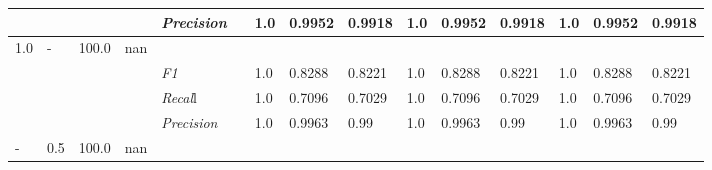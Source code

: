 \begin{table}[]
\begin{tabularx}{\textwidth}{XXlllllllllllll@{}}
                                                                    &                                                                     &                                                           &    & \textit{Precision} &                                                      & 1.0 & 0.9952 & 0.9918 & 1.0 & 0.9952 & 0.9918 & 1.0 & 0.9952 & 0.9918 \\ \midrule
1.0 & - & 100.0 & nan &                                                              &                                                                   &                                                             &                                                               &                                                                    &                                                              &                                                               &                                                                    &                                                              \\
                                                                    &                                                                     &                                                           &    & \textit{F1} &                                                      & 1.0        & 0.8288        & 0.8221        & 1.0        & 0.8288        & 0.8221        & 1.0        & 0.8288        & 0.8221        \\
                                                                    &                                                                     &                                                           &    & \textit{Recal}l &                                                      & 1.0    & 0.7096    & 0.7029    & 1.0    & 0.7096    & 0.7029    & 1.0    & 0.7096    & 0.7029    \\
                                                                    &                                                                     &                                                           &    & \textit{Precision} &                                                      & 1.0 & 0.9963 & 0.99 & 1.0 & 0.9963 & 0.99 & 1.0 & 0.9963 & 0.99 \\ \midrule
- & 0.5 & 100.0 & nan &                                                              &                                                                   &                                                             &                                                               &                                                                    &                                                              &                                                               &                                                                    &                                                              \\

\end{tabularx}
\end{table}

